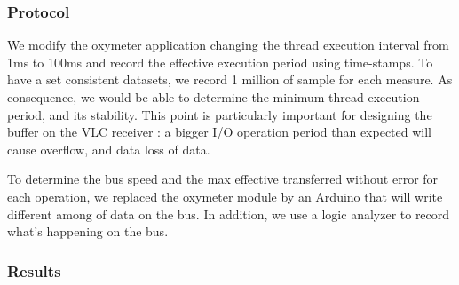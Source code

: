 \subsubsection{Protocol}
We modify the oxymeter application changing the thread execution interval from 1ms to 100ms and record the effective execution period using time-stamps. To have a set consistent datasets, we record 1 million of sample for each measure. As consequence, we would be able to determine the minimum thread execution period, and its stability.
This point is particularly important for designing the buffer on the VLC receiver : a bigger I/O operation period than expected will cause overflow, and data loss of data.

To determine the bus speed and the max effective transferred without error for each operation, we replaced the oxymeter module by an Arduino that will write different among of data on the bus. In addition, we use a logic analyzer to record what's happening on the bus.

\subsubsection{Results}

